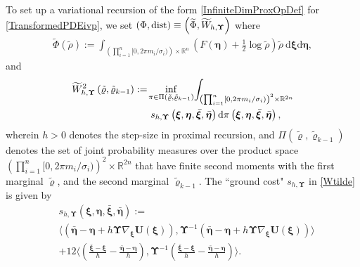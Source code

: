 \documentclass[10pt,twocolumn]{IEEEtran}
\newcommand{\differential}{{\rm{d}}}
\begin{document}
To set up a variational recursion of the form \eqref{InfiniteDimProxOpDef} for \eqref{TransformedPDEivp}, we set $(\Phi,{\rm{dist}}) \equiv \left(\widetilde{\Phi},\widetilde{W}_{h,\bm{\Upsilon}}\right)$ where
\begin{align}
\widetilde{\Phi}(\tilde{\rho}) := \!\!\int_{\left(\prod_{i=1}^{n}[0,2\pi m_{i}/\sigma_{i})\right) \times \mathbb{R}^{n}}\!\!\left(\!F(\boldsymbol{\eta})+\frac{1}{2} \log \tilde{\rho}\!\right) \tilde{\rho}\: \mathrm{d} \boldsymbol{\xi} \mathrm{d} \boldsymbol{\eta},
\label{Phitilde}	
\end{align}
and 
\begin{align}
&\widetilde{W}_{h,\bm{\Upsilon}}^{2}\left(\tilde{\varrho},\tilde{\varrho}_{k-1}\right) := \!\underset{\pi\in\Pi\left(\tilde{\varrho},\tilde{\varrho}_{k-1}\right)}{\inf}\!\displaystyle\int_{\left(\prod_{i=1}^{n}[0,2\pi m_{i}/\sigma_{i})\right)^{2} \times \mathbb{R}^{2n}}\nonumber\\
&\qquad\qquad\qquad\qquad s_{h,\bm{\Upsilon}}\left(\bm{\xi},\bm{\eta},\bar{\bm{\xi}},\bar{\bm{\eta}}\right)\differential\pi\left(\bm{\xi},\bm{\eta},\bar{\bm{\xi}},\bar{\bm{\eta}}\right),
\label{Wtilde}    
\end{align}
wherein $h>0$ denotes the step-size in proximal recursion, and $\Pi\left(\tilde{\varrho},\tilde{\varrho}_{k-1}\right)$ denotes the set of joint probability measures over the product space $\left(\prod_{i=1}^{n}[0,2\pi m_{i}/\sigma_{i})\right)^{2} \times \mathbb{R}^{2n}$ that have finite second moments  with the first marginal $\tilde{\varrho}$, and the second marginal $\tilde{\varrho}_{k-1}$. The ``ground cost" $s_{h,\bm{\Upsilon}}$ in \eqref{Wtilde} is given by
 \begin{align}
     &s_{h,\bm{\Upsilon}}\left(\bm{\xi},\bm{\eta},\bar{\bm{\xi}},\bar{\bm{\eta}}\right):=\nonumber\\
    &\bigg\langle\!\!\left(\bar{\bm{\eta}}-\bm{\eta}+h\bm{\Upsilon} \nabla_{\bm{\xi}} \bm{U}(\bm{\xi})\right),\bm{\Upsilon}^{-1}\!\left(\bar{\bm{\eta}}-\bm{\eta}+h\bm{\Upsilon} \nabla_{\bm{\xi}}\bm{U}(\bm{\xi})\right)\!\!\bigg\rangle\nonumber\\
    & + 12 \bigg\langle\!\left(\!\frac{\bar{\bm{\xi}}-\bm{\xi}}{h}-\frac{\bar{\bm{\eta}}-\bm{\eta}}{h}\!\right),\bm{\Upsilon}^{-1}\!\left(\!\frac{\bar{\bm{\xi}}-\bm{\xi}}{h}-\frac{\bar{\bm{\eta}}-\bm{\eta}}{h}\!\right)\!\bigg\rangle.
    \end{align}

\end{document}
